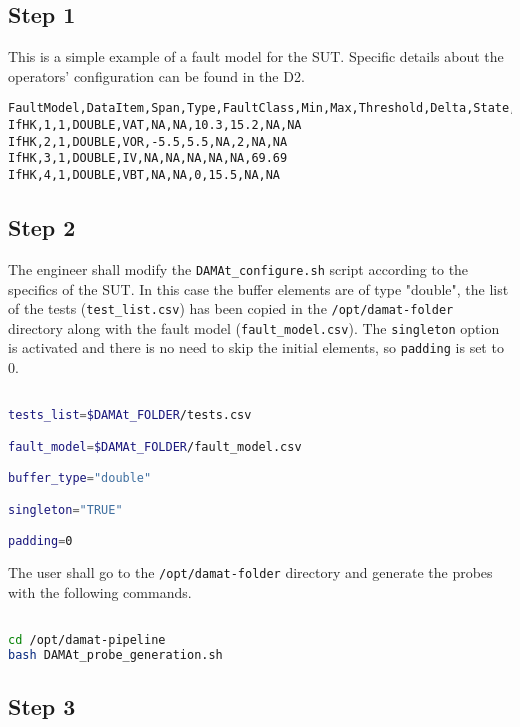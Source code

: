 \subsection{Step 1}

This is a simple example of a fault model for the SUT.
Specific details about the operators' configuration can be found in the D2.

\begin{lstlisting}
FaultModel,DataItem,Span,Type,FaultClass,Min,Max,Threshold,Delta,State,Value
IfHK,1,1,DOUBLE,VAT,NA,NA,10.3,15.2,NA,NA
IfHK,2,1,DOUBLE,VOR,-5.5,5.5,NA,2,NA,NA
IfHK,3,1,DOUBLE,IV,NA,NA,NA,NA,NA,69.69
IfHK,4,1,DOUBLE,VBT,NA,NA,0,15.5,NA,NA
\end{lstlisting}


\subsection{Step 2}

The engineer shall modify the \texttt{DAMAt\_configure.sh} script according to the specifics of the SUT.
In this case the buffer elements are of type "double", the list of the tests (\texttt{test\_list.csv}) has been copied in the \texttt{/opt/damat-folder} directory along with the fault model (\texttt{fault\_model.csv}).
The \texttt{singleton} option is activated and there is no need to skip the initial elements, so \texttt{padding} is set to 0.

\begin{lstlisting}[language=bash]

tests_list=$DAMAt_FOLDER/tests.csv

fault_model=$DAMAt_FOLDER/fault_model.csv

buffer_type="double"

singleton="TRUE"

padding=0

\end{lstlisting}

The user shall go to the \texttt{/opt/damat-folder} directory and generate the probes with the following commands.

\begin{lstlisting}[language=bash]

cd /opt/damat-pipeline
bash DAMAt_probe_generation.sh

\end{lstlisting}


\subsection{Step 3}

